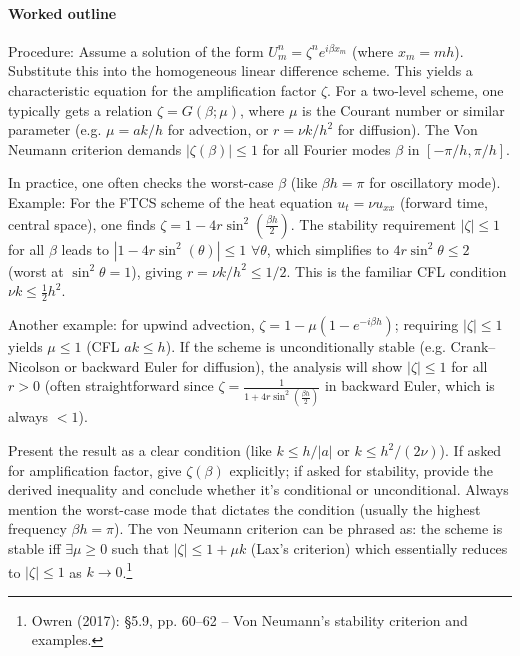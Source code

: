 \documentclass[a4paper,11pt]{article}
\begin{document}
\paragraph{Worked outline}
Procedure: Assume a solution of the form $U^n_m = \zeta^n e^{i\beta x_m}$ (where $x_m = m h$). Substitute this into the homogeneous linear difference scheme. This yields a characteristic equation for the amplification factor $\zeta$. For a two-level scheme, one typically gets a relation $\zeta = G(\beta; \mu)$, where $\mu$ is the Courant number or similar parameter (e.g. $\mu=ak/h$ for advection, or $r=\nu k/h^2$ for diffusion). The Von Neumann criterion demands $|\zeta(\beta)| \le 1$ for all Fourier modes $\beta$ in $[-\pi/h,\pi/h]$.

In practice, one often checks the worst-case $\beta$ (like $\beta h = \pi$ for oscillatory mode). Example: For the FTCS scheme of the heat equation $u_t=\nu u_{xx}$ (forward time, central space), one finds $\zeta = 1 - 4r\sin^2(\frac{\beta h}{2})$. The stability requirement $|\zeta| \le 1$ for all $\beta$ leads to $|1 - 4r\sin^2(\theta)| \le 1$ $\forall \theta$, which simplifies to $4r\sin^2\theta \le 2$ (worst at $\sin^2\theta=1$), giving $r=\nu k/h^2 \le 1/2$. This is the familiar CFL condition $\nu k \le \frac{1}{2}h^2$.

Another example: for upwind advection, $\zeta = 1 - \mu(1-e^{-i\beta h})$; requiring $|\zeta| \le 1$ yields $\mu \le 1$ (CFL $a k \le h$). If the scheme is unconditionally stable (e.g. Crank--Nicolson or backward Euler for diffusion), the analysis will show $|\zeta| \le 1$ for all $r>0$ (often straightforward since $\zeta = \frac{1}{1+4r\sin^2(\frac{\beta h}{2})}$ in backward Euler, which is always $<1$).

Present the result as a clear condition (like $k \le h/|a|$ or $k \le h^2/(2\nu)$). If asked for amplification factor, give $\zeta(\beta)$ explicitly; if asked for stability, provide the derived inequality and conclude whether it's conditional or unconditional. Always mention the worst-case mode that dictates the condition (usually the highest frequency $\beta h = \pi$). The von Neumann criterion can be phrased as: the scheme is stable iff $\exists \mu \ge 0$ such that $|\zeta| \le 1 + \mu k$ (Lax's criterion) which essentially reduces to $|\zeta| \le 1$ as $k \to 0$.\footnote{Owren (2017): §5.9, pp. 60--62 -- Von Neumann's stability criterion and examples.}
\end{document}
